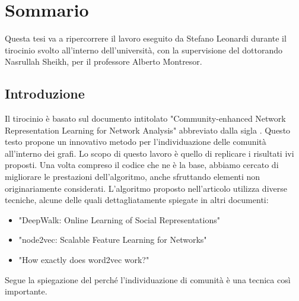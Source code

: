 %
%
%
\chapter{Sommario}\label{chap:0}
Questa tesi va a ripercorrere il lavoro eseguito da Stefano Leonardi durante il tirocinio svolto all'interno dell'università, con la supervisione del dottorando Nasrullah Sheikh, per il professore Alberto Montresor.
%
\section{Introduzione}
Il tirocinio è basato sul documento intitolato "Community-enhanced Network Representation Learning for Network Analysis"\cite{CNRL_paper} abbreviato dalla sigla \textbf{\cnrl}. Questo testo propone un innovativo metodo per l'individuazione delle comunità all'interno dei grafi. Lo scopo di questo lavoro è quello di replicare i risultati ivi proposti. Una volta compreso il codice che ne è la base, abbiamo cercato di migliorare le prestazioni dell'algoritmo, anche sfruttando elementi non originariamente considerati.\newline
L'algoritmo proposto nell'articolo utilizza diverse tecniche, alcune delle quali dettagliatamente spiegate in altri documenti:
\begin{itemize}
	\item "DeepWalk: Online Learning of Social Representations"\cite{DW_paper}
	\item "node2vec: Scalable Feature Learning for Networks"\cite{N2V_paper}
	\item "How exactly does word2vec work?"\cite{W2V_paper}
\end{itemize} 
Segue la spiegazione del perché l'individuazione di comunità è una tecnica così importante.
%
